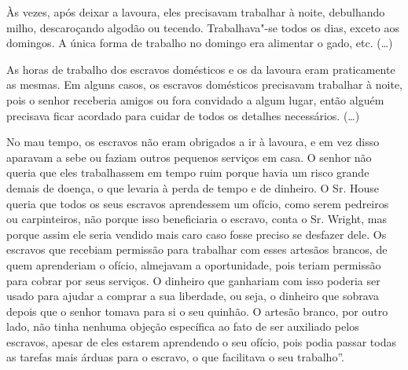 Às vezes, após deixar a lavoura, eles precisavam trabalhar à noite,
debulhando milho, descaroçando algodão ou tecendo. Trabalhava"-se todos
os dias, exceto aos domingos. A única forma de trabalho no domingo era
alimentar o gado, etc. (\ldots{})

As horas de trabalho dos escravos domésticos e os da lavoura eram
praticamente as mesmas. Em alguns casos, os escravos domésticos
precisavam trabalhar à noite, pois o senhor receberia amigos ou fora
convidado a algum lugar, então alguém precisava ficar acordado para
cuidar de todos os detalhes necessários. (\ldots{})

No mau tempo, os escravos não eram obrigados a ir à lavoura, e em vez
disso aparavam a sebe ou faziam outros pequenos serviços em casa. O
senhor não queria que eles trabalhassem em tempo ruim porque havia um
risco grande demais de doença, o que levaria à perda de tempo e de
dinheiro. O Sr. House queria que todos os seus escravos aprendessem um
ofício, como serem pedreiros ou carpinteiros, não porque isso
beneficiaria o escravo, conta o Sr. Wright, mas porque assim ele seria
vendido mais caro caso fosse preciso se desfazer dele. Os escravos que
recebiam permissão para trabalhar com esses artesãos brancos, de quem
aprenderiam o ofício, almejavam a oportunidade, pois teriam permissão
para cobrar por seus serviços. O dinheiro que ganhariam com isso poderia
ser usado para ajudar a comprar a sua liberdade, ou seja, o dinheiro que
sobrava depois que o senhor tomava para si o seu quinhão. O artesão
branco, por outro lado, não tinha nenhuma objeção específica ao fato de
ser auxiliado pelos escravos, apesar de eles estarem aprendendo o seu
ofício, pois podia passar todas as tarefas mais árduas para o escravo, o
que facilitava o seu trabalho''.

